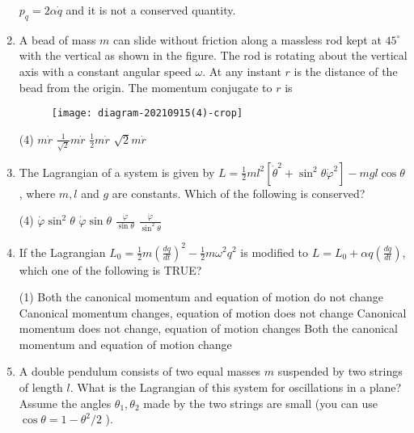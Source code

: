 \begin{enumerate}
\begin{tasks}
		\task[\textbf{D.}]  $p_{q}=2 \alpha \dot{q}$ and it is not a conserved quantity.
	\end{tasks}
	\item A bead of mass $m$ can slide without friction along a massless rod kept at $45^{\circ}$ with the vertical as shown in the figure. The rod is rotating about the vertical axis with a constant angular speed $\omega$. At any instant $r$ is the distance of the bead from the origin. The momentum conjugate to $r$ is
	{}
	\begin{figure}[H]
		\centering
		\texttt{[image: diagram-20210915(4)-crop]}
	\end{figure}
	\begin{tasks}(4)
		\task[\textbf{A.}] $m \dot{r}$
		\task[\textbf{B.}] $\frac{1}{\sqrt{2}} m \dot{r}$
		\task[\textbf{C.}] $\frac{1}{2} m \dot{r}$
		\task[\textbf{D.}] $\sqrt{2} m \dot{r}$
	\end{tasks}
	\item The Lagrangian of a system is given by
	$L=\frac{1}{2} m l^{2}\left[\dot{\theta}^{2}+\sin ^{2} \theta \dot{\varphi}^{2}\right]-m g l \cos \theta$, where $m, l$ and $g$ are constants.
	Which of the following is conserved?
	{}
	\begin{tasks}(4)
		\task[\textbf{A.}] $\dot{\varphi} \sin ^{2} \theta$
		\task[\textbf{B.}] $\dot{\varphi} \sin \theta$
		\task[\textbf{C.}] $\frac{\dot{\varphi}}{\sin \theta}$
		\task[\textbf{D.}] $\frac{\dot{\varphi}}{\sin ^{2} \theta}$
	\end{tasks}
	\item If the Lagrangian $L_{0}=\frac{1}{2} m\left(\frac{d q}{d t}\right)^{2}-\frac{1}{2} m \omega^{2} q^{2}$ is modified to $L=L_{0}+\alpha q\left(\frac{d q}{d t}\right)$, which one of the following is TRUE?
	{}
	\begin{tasks}(1)
		\task[\textbf{A.}] Both the canonical momentum and equation of motion do not change
		\task[\textbf{B.}] Canonical momentum changes, equation of motion does not change
		\task[\textbf{C.}] Canonical momentum does not change, equation of motion changes
		\task[\textbf{D.}] Both the canonical momentum and equation of motion change
	\end{tasks}
	\item  A double pendulum consists of two equal masses $m$ suspended by two strings of length $l$. What is the Lagrangian of this system for oscillations in a plane? Assume the angles $\theta_{1}, \theta_{2}$ made by the two strings are small (you can use $\cos \theta=1-\theta^{2} / 2$ ).\\

\end{enumerate}
